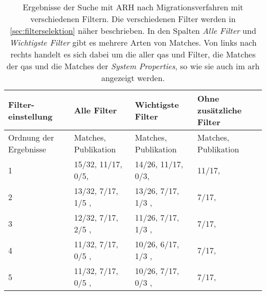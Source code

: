 \begin{table}[!h]
  \centering
  \begin{tabular}{m{2cm} m{4.3cm} m{4.3cm} m{2.5cm}}
    \toprule
    \textbf{Filter-einstellung} & \textbf{Alle Filter} & \textbf{Wichtigste Filter} & \textbf{Ohne zusätzliche Filter} \\ \hline
    Ordnung der Ergebnisse & Matches, Publikation & Matches, Publikation & Matches, Publikation \\ \midrule
    1 & 15/32, 11/17, 0/5, \cite{arh-result-no-filter-1} & 14/26, 11/17, 0/3, \cite{arh-result-no-filter-1} & 11/17, \cite{arh-result-no-filter-1}  \\ \hline
    2 & 13/32, 7/17, 1/5 , \cite{arh-result-no-filter-3}  & 13/26, 7/17, 1/3 , \cite{arh-result-no-filter-3} & 7/17, \cite{arh-result-no-filter-2} \\ \hline
    3 & 12/32, 7/17, 2/5 , \cite{arh-result-no-filter-2}  & 11/26, 7/17, 1/3 ,  \cite{arh-result-no-filter-2} & 7/17, \cite{arh-result-no-filter-3} \\ \hline
    4 & 11/32, 7/17, 0/5 , \cite{arh-result-no-filter-4}  & 10/26, 6/17, 1/3 , \cite{arh-result-important-filter-4} &  7/17, \cite{arh-result-no-filter-4} \\ \hline
    5 & 11/32, 7/17, 0/5 , \cite{arh-result-no-filter-5}  & 10/26, 7/17, 0/3 , \cite{arh-result-no-filter-4} &  7/17, \cite{arh-result-no-filter-5} \\
    \bottomrule
  \end{tabular}
  \caption[Surchergebnisse des ARH von Migrationsverfahren mit verschiedenen Filtern]{
    Ergebnisse der Suche mit ARH nach Migrationsverfahren mit verschiedenen Filtern.
    Die verschiedenen Filter werden in \cref{sec:filterselektion} näher beschrieben.
    In den Spalten \emph{Alle Filter} und \emph{Wichtigste Filter} gibt es mehrere Arten von Matches.
    Von links nach rechts handelt es sich dabei um die aller \glspl{qa} und Filter, die Matches der \glspl{qa} und die Matches der \emph{System Properties}, so wie sie auch im \gls{arh} angezeigt werden.
  }
  \label{tab:phase2-filter-results}
\end{table}


